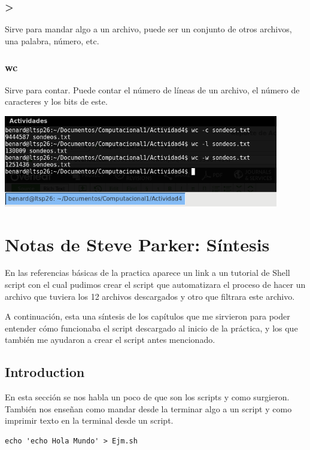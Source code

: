 \documentclass{article}
\begin{document}
\subsubsection*{>}
Sirve para mandar algo a un archivo, puede ser un conjunto de otros archivos, una palabra, número, etc.

\subsubsection*{wc}
Sirve para contar. Puede contar el número de líneas de un archivo, el número de caracteres y los bits de este.

\begin{center}
	\includegraphics[width=12cm]{wc.png}
\end{center}
\vspace{0.3cm}


\section{Notas de Steve Parker: Síntesis}
En las referencias básicas de la practica aparece un link a un tutorial de Shell script con el cual pudimos crear el script que automatizara el proceso de hacer un archivo que tuviera los 12 archivos descargados y otro que filtrara este archivo. 

A continuación, esta una síntesis de los capítulos que me sirvieron para poder entender cómo funcionaba el script descargado al inicio de la práctica, y los que también me ayudaron a crear el script antes mencionado.

\subsection{Introduction}
En esta sección se nos habla un poco de que son los scripts y como surgieron. También nos enseñan como mandar desde la terminar algo a un script y como imprimir texto en la terminal desde un script.

\begin{verbatim}
echo 'echo Hola Mundo' > Ejm.sh
\end{verbatim}
\end{document}
